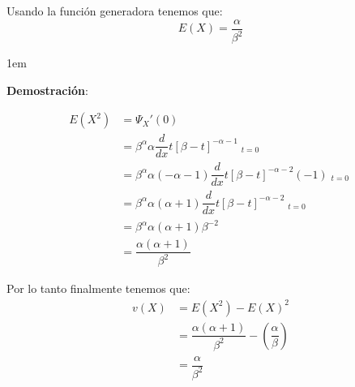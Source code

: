 \documentclass[12pt, fleqn]{report}                             %
\newenvironment{SmallIndentation}[1][0.75em]                    %
        {\begin{adjustwidth}{#1}{}\begin{footnotesize}}             %
        {\end{footnotesize}\end{adjustwidth}}                       %
\theoremstyle{break}                                            %
\newcommand{\Wrap}[1]{\left( #1 \right)}                        %
\newcommand \MiniDerivate[1][x] {\dfrac{d}{d #1}}               %
\DeclareMathOperator \Evaluate  {\Big|}                         %
\begin{document}
                Usando la función generadora tenemos que:
                \begin{equation*}
                    E(X) = \dfrac{\alpha}{\beta^2}
                \end{equation*}

                \begin{SmallIndentation}[1em]
                    \textbf{Demostración}:
                    
                    \begin{align*}
                        E(X^2)
                            &= \Psi_X'(0)               \\
                            &=  \beta^\alpha \alpha 
                                    \MiniDerivate{t} [\beta - t]^{-\alpha -1} \Evaluate_{t = 0}         \\
                            &= \beta^\alpha \alpha (-\alpha -1) 
                                    \MiniDerivate{t} [\beta - t]^{-\alpha -2}(-1) \Evaluate_{t = 0}     \\
                            &= \beta^\alpha \alpha (\alpha+1) 
                                    \MiniDerivate{t} [\beta - t]^{-\alpha -2} \Evaluate_{t = 0}         \\
                            &= \beta^\alpha \alpha (\alpha+1) 
                                    \beta^{-2}                                                          \\
                            &= \dfrac{\alpha(\alpha + 1)}{\beta^2}
                    \end{align*}

                    Por lo tanto finalmente tenemos que:
                    \begin{align*}
                        v(X)
                            &= E(X^2) - E(X)^2                                                                \\
                            &= \dfrac{\alpha(\alpha + 1)}{\beta^2} - \Wrap{\dfrac{\alpha}{\beta}}             \\
                            &= \dfrac{\alpha}{\beta^2}
                    \end{align*}
                
                \end{SmallIndentation}



            \clearpage
\end{document}
